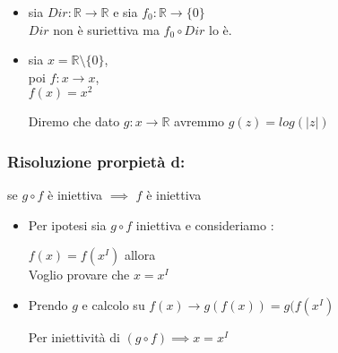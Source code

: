 \documentclass[article,12pt]{book}
\begin{document}
\begin{enumerate}
{\begin{itemize}
\begin{itemize}
    \item Ha solo due input possibili (\( 0 \) e \( 1 \)) che vengono mappati a due valori distinti \( Dir(1) \) e \( Dir(\sqrt{2}) \).
    \item La non iniettività di \( Dir \) non influisce sulla composizione \( Dir \circ f \) in questo caso, poiché gli argomenti \( f(0) \) e \( f(1) \) sono distinti e quindi mappati a valori distinti.
\end{itemize}
    \item sia $Dir : \mathbb{R} \rightarrow \mathbb{R}$ e sia $f_0 : \mathbb{R} \rightarrow \{0 \}$ \\
    $Dir$ non è suriettiva ma $f_0 \circ Dir$ lo è.
    \item sia $x = \mathbb{R} \setminus \{0\}$, \\
    poi $f : x \rightarrow x$, \\  $f(x) = x^2$
        \begin{center}
            Diremo che dato $g : x \rightarrow \mathbb{R}$ avremmo $g(z) = log(|z|)$
        \end{center}
    \end{itemize}
\newpage
\subsubsection{Risoluzione prorpietà d:}
se $g \circ f$ è iniettiva $\implies$ $f$ è iniettiva
    \begin{itemize}
        \item Per ipotesi sia $g \circ f$ iniettiva e consideriamo :
            \begin{center}
                $f(x) = f(x^I)$ allora \\
                Voglio provare che $x = x^I$
            \end{center}
        \item Prendo $g$ e calcolo su $f(x) \rightarrow g(f(x)) = g(f(x^I)$
            \begin{center}
                Per iniettività di $(g \circ f) \implies x = x^I$
            \end{center}
    \end{itemize}
}
\end{enumerate}
\end{document}
